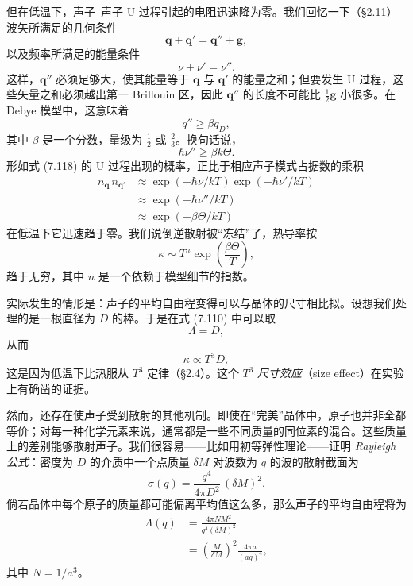 但在低温下，声子--声子 U 过程引起的电阻迅速降为零。我们回忆一下（§2.11）波矢所满足的几何条件
\begin{equation*}
\mathbf{q}+\mathbf{q}'=\mathbf{q}''+\mathbf{g},\tag{7.117}
\end{equation*}
以及频率所满足的能量条件
\begin{equation*}
\nu+\nu'=\nu''.\tag{7.118}
\end{equation*}
这样，$\mathbf{q}''$ 必须足够大，使其能量等于 $\mathbf{q}$ 与 $\mathbf{q}'$ 的能量之和；但要发生 U 过程，这些矢量之和必须越出第一 Brillouin 区，因此 $\mathbf{q}''$ 的长度不可能比 $\frac{1}{2}\mathbf{g}$ 小很多。在 Debye 模型中，这意味着
\begin{equation*}
q''\geqslant\beta q_{D},\tag{7.119}
\end{equation*}
其中 $\beta$ 是一个分数，量级为 $\frac{1}{2}$ 或 $\frac{2}{3}$。换句话说，
\begin{equation*}
\hbar\nu''\geqslant\beta k\Theta.\tag{7.120}
\end{equation*}
形如式 (7.118) 的 U 过程出现的概率，正比于相应声子模式占据数的乘积
\begin{align*}
n_{\mathbf{q}}\,n_{\mathbf{q}'}&\approx\exp(-\hbar\nu/kT)\exp(-\hbar\nu'/kT)\\
&\approx\exp(-\hbar\nu''/kT)\\
&\approx\exp(-\beta\Theta/kT)\tag{7.121}
\end{align*}
在低温下它迅速趋于零。我们说倒逆散射被“冻结”了，热导率按
\begin{equation*}
\kappa\sim T^{n}\exp\left(\frac{\beta\Theta}{T}\right),\tag{7.122}
\end{equation*}
趋于无穷，其中 $n$ 是一个依赖于模型细节的指数。

实际发生的情形是：声子的平均自由程变得可以与晶体的尺寸相比拟。设想我们处理的是一根直径为 $D$ 的棒。于是在式 (7.110) 中可以取
\begin{equation*}
\Lambda=D,\tag{7.123}
\end{equation*}
从而
\begin{equation*}
\kappa\propto T^{3}D,\tag{7.124}
\end{equation*}
这是因为低温下比热服从 $T^{3}$ 定律（§2.4）。这个 $T^{3}$ \emph{尺寸效应}（size effect）在实验上有确凿的证据。

然而，还存在使声子受到散射的其他机制。即使在“完美”晶体中，原子也并非全都等价；对每一种化学元素来说，通常都是一些不同质量的同位素的混合。这些质量上的差别能够散射声子。我们很容易——比如用初等弹性理论——证明 \emph{Rayleigh 公式}：密度为 $D$ 的介质中一个点质量 $\delta M$ 对波数为 $q$ 的波的散射截面为
\begin{equation*}
\sigma(q)=\frac{q^{4}}{4\pi D^{2}}\,(\delta M)^{2}.\tag{7.125}
\end{equation*}
倘若晶体中每个原子的质量都可能偏离平均值这么多，那么声子的平均自由程将为
\begin{align*}
\Lambda(q)&=\frac{4\pi NM^{2}}{q^{4}(\delta M)^{2}}\\
&=\left(\frac{M}{\delta M}\right)^{2}\frac{4\pi a}{(aq)^{4}},\tag{7.126}
\end{align*}
其中 $N=1/a^{3}$。

